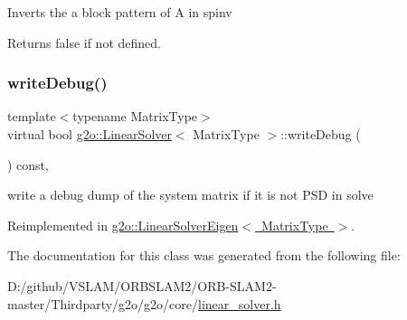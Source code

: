 Inverts the a block pattern of A in spinv \begin{DoxyReturn}{Returns}
false if not defined. 
\end{DoxyReturn}
\mbox{\label{classg2o_1_1_linear_solver_ac4b23c56cf69759a692906fc8816cf8f}} 
\subsubsection{\texorpdfstring{write\+Debug()}{writeDebug()}}
{\footnotesize\ttfamily template$<$typename Matrix\+Type$>$ \\
virtual bool \mbox{\hyperlink{classg2o_1_1_linear_solver}{g2o\+::\+Linear\+Solver}}$<$ Matrix\+Type $>$\+::write\+Debug (\begin{DoxyParamCaption}{ }\end{DoxyParamCaption}) const\hspace{0.3cm}{\ttfamily [inline]}, {\ttfamily [virtual]}}



write a debug dump of the system matrix if it is not P\+SD in solve 



Reimplemented in \mbox{\hyperlink{classg2o_1_1_linear_solver_eigen_ad9bccc1b4bcd3cc5e107ac09ac93cf4b}{g2o\+::\+Linear\+Solver\+Eigen$<$ Matrix\+Type $>$}}.



The documentation for this class was generated from the following file\+:\begin{DoxyCompactItemize}
\item 
D\+:/github/\+V\+S\+L\+A\+M/\+O\+R\+B\+S\+L\+A\+M2/\+O\+R\+B-\/\+S\+L\+A\+M2-\/master/\+Thirdparty/g2o/g2o/core/\mbox{\hyperlink{linear__solver_8h}{linear\+\_\+solver.\+h}}\end{DoxyCompactItemize}
